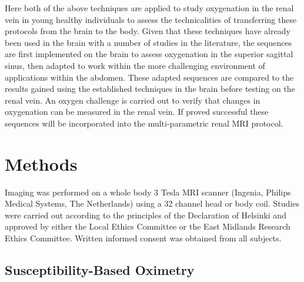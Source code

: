 Here both of the above techniques are applied to study oxygenation in the renal vein in young healthy individuals to assess the technicalities of transferring these protocols from the brain to the body. Given that these techniques have already been used in the brain with a number of studies in the literature, the sequences are first implemented on the brain to assess oxygenation in the superior sagittal sinus, then adapted to work within the more challenging environment of applications within the abdomen. These adapted sequences are compared to the results gained using the established techniques in the brain before testing on the renal vein. An oxygen challenge is carried out to verify that changes in oxygenation can be measured in the renal vein. If proved successful these sequences will be incorporated into the multi-parametric renal \ac{MRI} protocol.

\newpage
\section{Methods}

Imaging was performed on a whole body 3 Tesla \ac{MRI} scanner (Ingenia, Philips Medical Systems, The Netherlands) using a 32 channel head or body coil. Studies were carried out according to the principles of the Declaration of Helsinki and approved by either the Local Ethics Committee or the East Midlands Research Ethics Committee. Written informed consent was obtained from all subjects.

\subsection{Susceptibility-Based Oximetry}
\label{sec:SBO}
